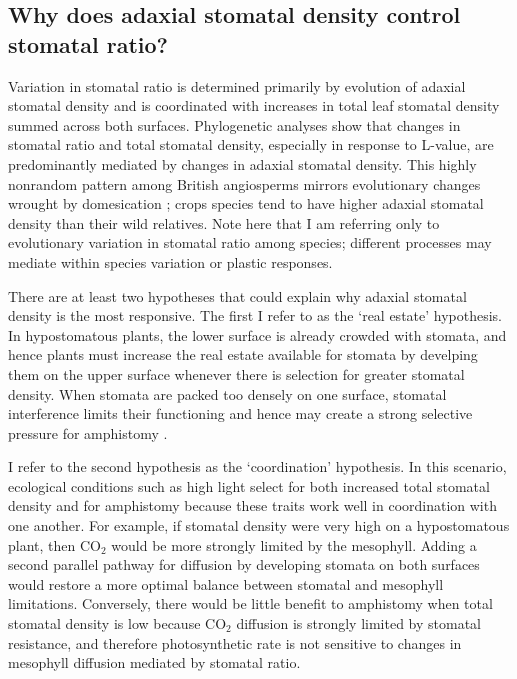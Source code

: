 \documentclass[12pt, oneside]{article}
\newcommand{\el}{L-value}
\begin{document}

\subsection*{Why does adaxial stomatal density control stomatal ratio?}

Variation in stomatal ratio is determined primarily by evolution of adaxial stomatal density and is coordinated with increases in total leaf stomatal density summed across both surfaces. Phylogenetic analyses show that changes in stomatal ratio and total stomatal density, especially in response to \el, are predominantly mediated by changes in adaxial stomatal density. This highly nonrandom pattern among British angiosperms mirrors evolutionary changes wrought by domesication \citep{Milla_etal_2013}; crops species tend to have higher adaxial stomatal density than their wild relatives. Note here that I am referring only to evolutionary variation in stomatal ratio among species; different processes may mediate within species variation or plastic responses.

There are at least two hypotheses that could explain why adaxial stomatal density is the most responsive. The first I refer to as the `real estate' hypothesis. In hypostomatous plants, the lower surface is already crowded with stomata, and hence plants must increase the real estate available for stomata by develping them on the upper surface whenever there is selection for greater stomatal density. When stomata are packed too densely on one surface, stomatal interference limits their functioning and hence may create a strong selective pressure for amphistomy \citep{Parlange_Waggoner_1970, Dow_etal_2014a}. 

I refer to the second hypothesis as the `coordination' hypothesis. In this scenario, ecological conditions such as high light select for both increased total stomatal density and for amphistomy because these traits work well in coordination with one another. For example, if stomatal density were very high on a hypostomatous plant, then CO$_2$ would be more strongly limited by the mesophyll. Adding a second parallel pathway for diffusion by developing stomata on both surfaces would restore a more optimal balance between stomatal and mesophyll limitations. Conversely, there would be little benefit to amphistomy when total stomatal density is low because CO$_2$ diffusion is strongly limited by stomatal resistance, and therefore photosynthetic rate is not sensitive to changes in mesophyll diffusion mediated by stomatal ratio.
\end{document}
